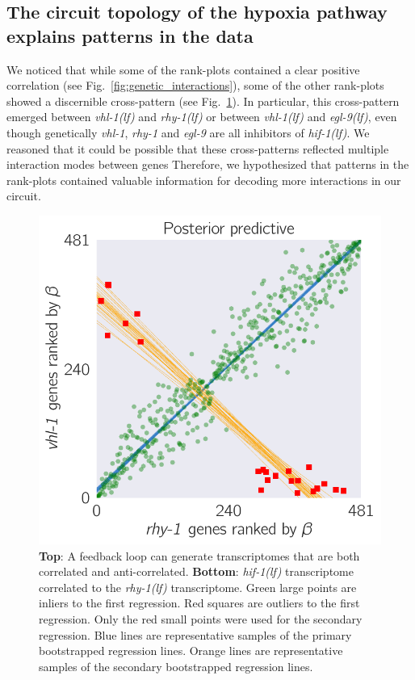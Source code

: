 \documentclass[9pt,twocolumn,twoside]{pnas-new}
\newcommand{\gene}[1]{\emph{#1}}
\newcommand{\egl}{\emph{egl-9(lf)}}
\newcommand{\rhy}{\emph{rhy-1(lf)}}
\newcommand{\vhl}{\emph{vhl-1(lf)}}
\newcommand{\hif}{\emph{hif-1(lf)}}
\begin{document}
\subsection*{The circuit topology of the hypoxia pathway explains patterns in
            the data}
\label{sub:topology}
We noticed that while some of the rank-plots contained a clear positive correlation
(see Fig.~\ref{fig:genetic_interactions}), some of the other rank-plots showed
a discernible cross-pattern (see Fig.~\ref{fig:xpattern}). In particular, this
cross-pattern emerged between \vhl{} and \rhy{} or between \vhl{} and \egl{},
even though genetically \gene{vhl-1}, \gene{rhy-1} and \gene{egl-9} are all
inhibitors of \hif{}. We reasoned that it could be possible that these
cross-patterns reflected multiple interaction modes between genes
Therefore, we hypothesized that patterns in the rank-plots contained
valuable information for decoding more interactions in our circuit.

\begin{figure}[tbhp]
\centering
\includegraphics[width=\linewidth]{figs/multiplemodes-ed.pdf}
\caption{
\textbf{Top}: A feedback loop can generate transcriptomes that are both
correlated and anti-correlated. \textbf{Bottom}: \hif{} transcriptome correlated
to the \rhy{} transcriptome. Green large points are inliers to the first
regression. Red squares are outliers to the first regression. Only the red
small points were used for the secondary regression. Blue lines are representative
samples of the primary bootstrapped regression lines. Orange lines are
representative samples of the secondary bootstrapped regression lines.
}
\label{fig:xpattern}
\end{figure}
\end{document}

